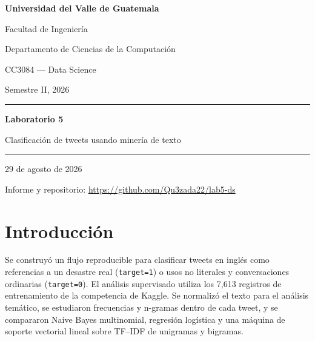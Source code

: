 \documentclass[11pt,letterpaper]{article}
\newcommand{\code}[1]{\texttt{#1}}
\begin{document}

\begin{titlepage}
  \centering
  {\Large\bfseries Universidad del Valle de Guatemala\par}
  \vspace{0.35cm}
  {\large Facultad de Ingeniería\par}
  {\large Departamento de Ciencias de la Computación\par}
  \vspace{1.2cm}
  {\large CC3084 --- Data Science\par}
  {\large Semestre II, 2026\par}
  \vfill
  {\color{uvgblue}\rule{\textwidth}{1.2pt}\par}
  \vspace{0.45cm}
  {\Huge\bfseries Laboratorio 5\par}
  \vspace{0.25cm}
  {\LARGE Clasificación de tweets usando minería de texto\par}
  \vspace{0.45cm}
  {\color{uvgblue}\rule{\textwidth}{1.2pt}\par}
  \vfill
  \vfill
  {\large 29 de agosto de 2026\par}
  \vspace{0.45cm}
  {\small Informe y repositorio: \url{https://github.com/Qu3zada22/lab5-ds}\par}
\end{titlepage}

\begingroup
\small
\setlength{\parskip}{0pt}
\tableofcontents
\endgroup
\clearpage
{}

\section{Introducción}

Se construyó un flujo reproducible para clasificar tweets en inglés como referencias a un desastre real (\code{target=1}) o usos no literales y conversaciones ordinarias (\code{target=0}). El análisis supervisado utiliza los 7,613 registros de entrenamiento de la competencia de Kaggle. Se normalizó el texto para el análisis temático, se estudiaron frecuencias y n-gramas dentro de cada tweet, y se compararon Naive Bayes multinomial, regresión logística y una máquina de soporte vectorial lineal sobre TF--IDF de unigramas y bigramas.
\end{document}
